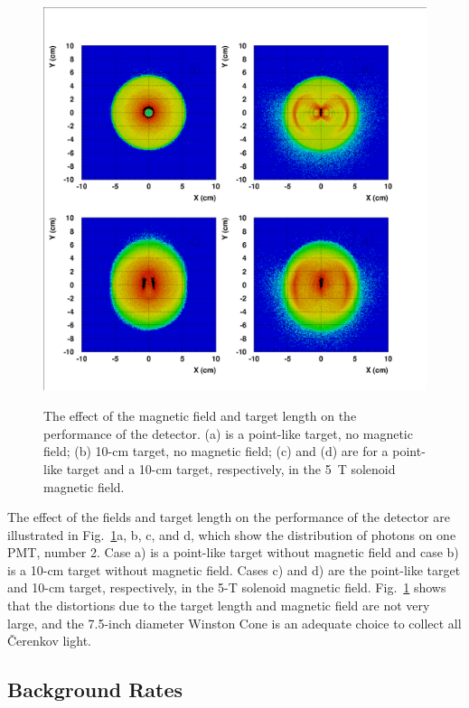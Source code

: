 \begin{figure}[htbp]
\centering
\includegraphics[height=12cm,angle=0]{MC-simulation/targ_field1.eps}
\caption{\small{The effect of the magnetic field and target length on the 
performance of the detector.  (a) is a point-like target, no magnetic field; 
(b) 10-cm target, no magnetic field; (c) and (d) are for a point-like target 
and a 10-cm target, respectively, in the 5~T solenoid magnetic field.}}
\label{fields}
\end{figure}

The effect of the fields and target length on the performance of the 
detector are illustrated in Fig.~\ref{fields}a, b, c, and d, which show 
the distribution of photons on one PMT, number 2.  Case a) is a point-like 
target without magnetic field and case b) is a 10-cm target without magnetic 
field. Cases c) and d) are the point-like target and 10-cm target,
respectively, in the 5-T solenoid magnetic field.  Fig.~\ref{fields} shows 
that the distortions due to the target length and magnetic field are not 
very large, and the 7.5-inch diameter Winston Cone is an adequate choice
to collect all {\v C}erenkov light.

\subsection{Background Rates}

